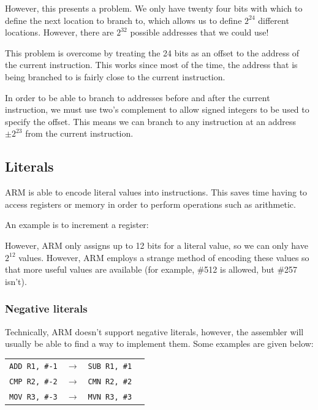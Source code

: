\documentclass{article}
\begin{document}
However, this presents a problem. We only have twenty four bits with which to define the next location to branch to, which allows us to define $2^24$ different locations. However, there are $2^32$ possible addresses that we could use!

This problem is overcome by treating the 24 bits as an offset to the address of the current instruction. This works since most of the time, the address that is being branched to is fairly close to the current instruction.

In order to be able to branch to addresses before and after the current instruction, we must use two's complement to allow signed integers to be used to specify the offset. This means we can branch to any instruction at an address $\pm 2^{23}$ from the current instruction.

\subsection{Literals}

ARM is able to encode literal values into instructions. This saves time having to access registers or memory in order to perform operations such as arithmetic.

An example is to increment a register:


However, ARM only assigns up to 12 bits for a literal value, so we can only have $2^{12}$ values. However, ARM employs a strange method of encoding these values so that more useful values are available (for example, \#512 is allowed, but \#257 isn't).

\subsubsection{Negative literals}

Technically, ARM doesn't support negative literals, however, the assembler will usually be able to find a way to implement them. Some examples are given below:

\begin{center}
    \begin{tabular}{l l l r}
        {\tt ADD R1, \#-1} & $\rightarrow$ & {\tt SUB R1, \#1}\\
        {\tt CMP R2, \#-2} & $\rightarrow$ & {\tt CMN R2, \#2}\\
        {\tt MOV R3, \#-3} & $\rightarrow$ & {\tt MVN R3, \#3}\\
    \end{tabular}
\end{center}
\end{document}
